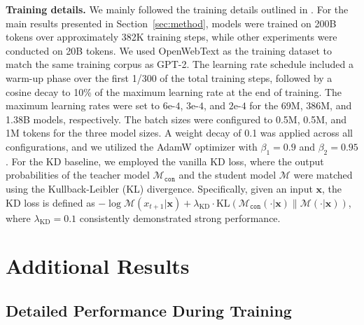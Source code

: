 \documentclass[]{fairmeta}
\def\rvx{{\mathbf{x}}}
\begin{document}
\textbf{Training details.} 
We mainly followed the training details outlined in \citep{brown2020language}. For the main results presented in Section~\ref{sec:method}, models were trained on 200B tokens over approximately 382K training steps, while other experiments were conducted on 20B tokens. We used OpenWebText as the training dataset to match the same training corpus as GPT-2. The learning rate schedule included a warm-up phase over the first 1/300 of the total training steps, followed by a cosine decay to 10\% of the maximum learning rate at the end of training. The maximum learning rates were set to $6\text{e-}4$, $3\text{e-}4$, and $2\text{e-}4$ for the 69M, 386M, and 1.38B models, respectively. The batch sizes were configured to 0.5M, 0.5M, and 1M tokens for the three model sizes. A weight decay of 0.1 was applied across all configurations, and we utilized the AdamW optimizer \citep{loshchilov2017decoupled} with $\beta_1 = 0.9$ and $\beta_2 = 0.95$. For the KD baseline, we employed the vanilla KD loss, where the output probabilities of the teacher model $\mathcal{M}_{\mathtt{con}}$ and the student model $\mathcal{M}$ were matched using the Kullback-Leibler (KL) divergence. Specifically, given an input $\rvx$, the KD loss is defined as $-\log \mathcal{M}(x_{t+1}|\rvx) + \lambda_\text{KD} \cdot \mathrm{KL}(\mathcal{M}_{\mathtt{con}}(\cdot|\rvx) \| \mathcal{M}(\cdot|\rvx))$, where $\lambda_\text{KD}=0.1$ consistently demonstrated strong performance.

\section{Additional Results}

\subsection{Detailed Performance During Training}
\end{document}
